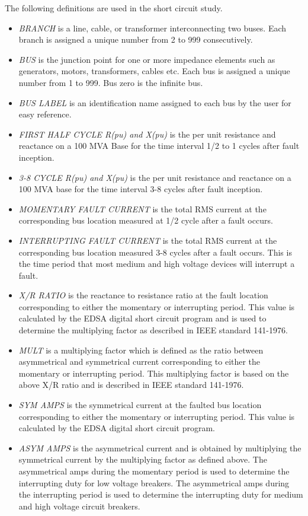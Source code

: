 \noindent The following definitions are used in the short circuit study.
\begin{itemize}
	\item \emph{BRANCH} is a line, cable, or transformer interconnecting two buses. Each branch is assigned a unique number from 2 to 999 consecutively. 
	\item \emph{BUS} is the junction point for one or more impedance elements such as generators, motors, transformers, cables etc. Each bus is assigned a unique
number from 1 to 999. Bus zero is the infinite bus.
	\item \emph{BUS LABEL} is an identification name assigned to each bus by the user for easy reference.
	\item \emph{FIRST HALF CYCLE R(pu) and X(pu)} is the per unit resistance and reactance on a 100 MVA Base for the time interval 1/2 to 1 cycles after fault inception.
	\item \emph{3-8 CYCLE R(pu) and X(pu)} is the per unit resistance and reactance on a 100 MVA base for the time interval 3-8 cycles after fault inception.
	\item \emph{MOMENTARY FAULT CURRENT} is the total RMS current at the corresponding bus location measured at 1/2 cycle after a fault occurs.

	\item \emph{INTERRUPTING FAULT CURRENT} is the total RMS current at the corresponding bus location measured 3-8 cycles after a fault occurs. This is the time period that most medium and high voltage devices will interrupt a fault.
	\item \emph{X/R RATIO} is the reactance to resistance ratio at the fault location corresponding to either the momentary or interrupting period. This value is calculated by the EDSA digital short circuit program and is used to determine the multiplying factor as described in IEEE standard 141-1976.
	\item \emph{MULT} is a multiplying factor which is defined as the ratio between asymmetrical and symmetrical current corresponding to either the momentary or interrupting
period. This multiplying factor is based on the above X/R ratio and is described in IEEE standard 141-1976.
	\item \emph{SYM AMPS} is the symmetrical current at the faulted bus location corresponding
to either the momentary or interrupting period. This value is calculated by the
EDSA digital short circuit program.
	\item \emph{ASYM AMPS} is the asymmetrical current and is obtained by multiplying the symmetrical current by the multiplying factor as defined above. The asymmetrical amps during the momentary period is used to determine the interrupting duty for low voltage breakers. The asymmetrical amps during the interrupting period is used to determine the interrupting duty for medium and high voltage circuit breakers.
\end{itemize}